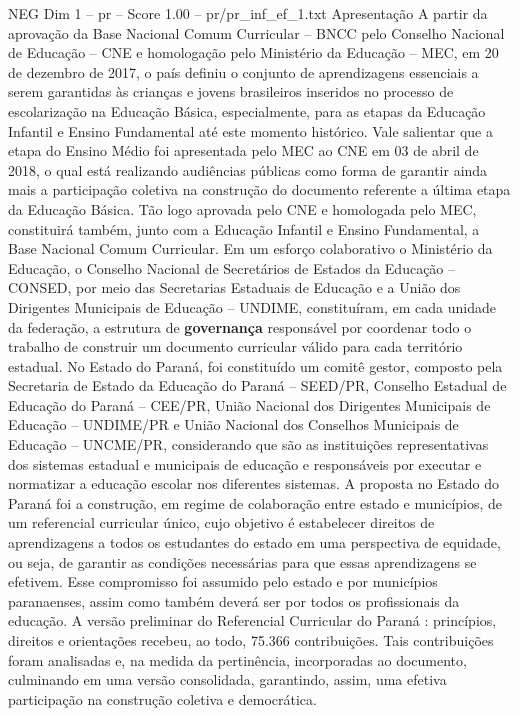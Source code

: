 \begin{textsample}{NEG Dim 1 – pr – Score 1.00 – pr/pr\_inf\_ef\_1.txt}  \label{ex:f1_neg_261}
Apresentação A partir da aprovação da Base Nacional Comum Curricular – BNCC pelo Conselho Nacional de Educação – CNE e homologação pelo Ministério da Educação – MEC, em 20 de dezembro de 2017, o país definiu o conjunto de aprendizagens essenciais a serem garantidas às crianças e jovens brasileiros inseridos no processo de escolarização na Educação Básica, especialmente, para as etapas da Educação Infantil e Ensino Fundamental até este momento histórico.
Vale salientar que a etapa do Ensino Médio foi apresentada pelo MEC ao CNE em 03 de abril de 2018, o qual está realizando audiências públicas como forma de garantir ainda mais a participação coletiva na construção do documento referente a última etapa da Educação Básica.
Tão logo aprovada pelo CNE e homologada pelo MEC, constituirá também, junto com a Educação Infantil e Ensino Fundamental, a Base Nacional Comum Curricular.
Em um esforço colaborativo o Ministério da Educação, o Conselho Nacional de Secretários de Estados da Educação – CONSED, por meio das Secretarias Estaduais de Educação e a União dos Dirigentes Municipais de Educação – UNDIME, constituíram, em cada unidade da federação, a estrutura de \textbf{governança} responsável por coordenar todo o trabalho de construir um documento curricular válido para cada território estadual.
No Estado do Paraná, foi constituído um comitê gestor, composto pela Secretaria de Estado da Educação do Paraná – SEED/PR, Conselho Estadual de Educação do Paraná – CEE/PR, União Nacional dos Dirigentes Municipais de Educação – UNDIME/PR e União Nacional dos Conselhos Municipais de Educação – UNCME/PR, considerando que são as instituições representativas dos sistemas estadual e municipais de educação e responsáveis por executar e normatizar a educação escolar nos diferentes sistemas.
A proposta no Estado do Paraná foi a construção, em regime de colaboração entre estado e municípios, de um referencial curricular único, cujo objetivo é estabelecer direitos de aprendizagens a todos os estudantes do estado em uma perspectiva de equidade, ou seja, de garantir as condições necessárias para que essas aprendizagens se efetivem.
Esse compromisso foi assumido pelo estado e por municípios paranaenses, assim como também deverá ser por todos os profissionais da educação.
A versão preliminar do Referencial Curricular do Paraná : princípios, direitos e orientações recebeu, ao todo, 75.366 contribuições.
Tais contribuições foram analisadas e, na medida da pertinência, incorporadas ao documento, culminando em uma versão consolidada, garantindo, assim, uma efetiva participação na construção coletiva e democrática.

\end{textsample}
